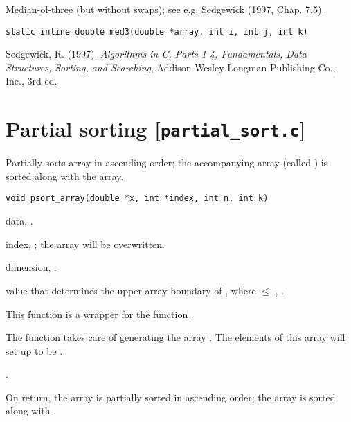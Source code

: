 \documentclass[a4paper,oneside,10pt,DIV=12]{scrartcl}
\def\DATA#1#2#3{
	\item[\code{#1}] #2, \code{double array[#3]}.}
\begin{document}
\begin{Description}
Median-of-three (but without swaps); see e.g. Sedgewick (1997, Chap. 7.5).
\end{Description}
\begin{Usage}
\begin{verbatim}
static inline double med3(double *array, int i, int j, int k)
\end{verbatim}
\end{Usage}
\begin{References}
Sedgewick, R. (1997). \textit{Algorithms in C, Parts 1-4, Fundamentals, Data
Structures, Sorting, and Searching}, Addison-Wesley Longman Publishing Co.,
Inc., 3rd ed.
\end{References}


\section{Partial sorting [\texttt{partial\_sort.c}]}

\begin{Description}
Partially sorts array  in ascending order; the accompanying
 array (called ) is sorted along with the array.
\end{Description}
\begin{Usage}
\begin{verbatim}
void psort_array(double *x, int *index, int n, int k)
\end{verbatim}
\end{Usage}
\begin{Arguments}
	\begin{ldescription}
		\DATA{x}{data}{n}
		\item[\code{index}] index, ; the array will be
			overwritten.
		\item[\code{n}] dimension, \code{[int]}.
		\item[\code{k}] value that determines the upper array boundary of
			, where  $\leq$ , \code{[int]}.
	\end{ldescription}
\end{Arguments}
\begin{Details}
This function is a wrapper for the function
.

The function takes care of generating the array . The elements of
this array will set up to be .
\end{Details}
\begin{Dependency}
.
\end{Dependency}
\begin{Value}
On return, the array  is partially sorted in ascending order;
the array  is sorted along with .
\end{Value}
\end{document}
